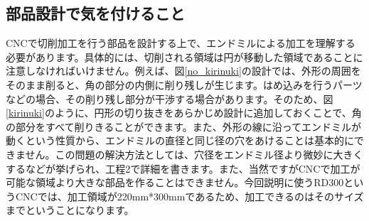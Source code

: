 \documentclass[b5paper, 9pt, twocolumn, titlepage,openany]{jsbook}%
\begin{document}

\subsection{部品設計で気を付けること}
CNCで切削加工を行う部品を設計する上で、エンドミルによる加工を理解する必要があります。具体的には、切削される領域は円が移動した領域であることに注意しなければいけません。例えば、図\ref{no_kirinuki}の設計では、外形の周囲をそのまま削ると、角の部分の内側に削り残しが生じます。はめ込みを行うパーツなどの場合、その削り残し部分が干渉する場合があります。そのため、図\ref{kirinuki}のように、円形の切り抜きをあらかじめ設計に追加しておくことで、角の部分をすべて削りきることができます。また、外形の線に沿ってエンドミルが動くという性質から、エンドミルの直径と同じ径の穴をあけることは基本的にできません。この問題の解決方法としては、穴径をエンドミル径より微妙に大きくするなどが挙げられ、工程2で詳細を書きます。また、当然ですがCNCで加工が可能な領域より大きな部品を作ることはできません。今回説明に使うRD300というCNCでは、加工領域が220mm*300mmであるため、加工できるのはそのサイズまでということになります。\\
\end{document}
